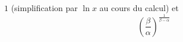 $1$ (simplification par $\ln x$ au cours du calcul) et
\begin{displaymath}
 \left(\frac{\beta}{\alpha} \right)^{\frac{1}{\beta - \alpha}} 
\end{displaymath}
